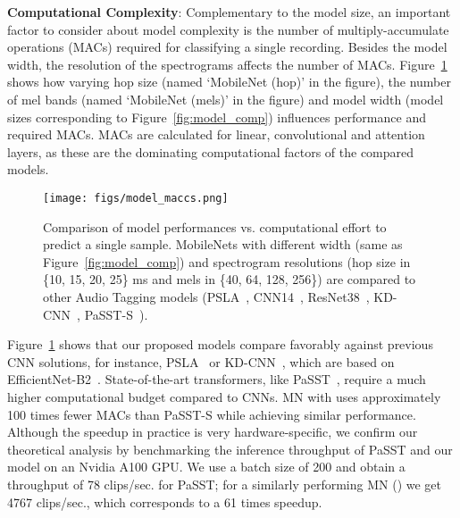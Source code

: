 \documentclass{article}
\begin{document}
\textbf{Computational Complexity}: Complementary to the model size, an important factor to consider about model complexity is the number of multiply-accumulate operations (MACs) required for classifying a single recording. Besides the model width, the resolution of the spectrograms affects the number of MACs. Figure~\ref{fig:model_maccs} shows how varying hop size (named `MobileNet (hop)' in the figure), the number of mel bands (named `MobileNet (mels)' in the figure) and model width (model sizes corresponding to Figure~\ref{fig:model_comp}) influences performance and required MACs. MACs are calculated for linear, convolutional and attention layers, as these are the dominating computational factors of the compared models. 

\begin{figure}[t]
\centering
{\texttt{[image: figs/model\_maccs.png]}}
\caption{Comparison of model performances vs. computational effort to predict a single sample. MobileNets with different width (same as Figure~\ref{fig:model_comp}) and spectrogram resolutions (hop size in \{10, 15, 20, 25\} ms and mels in \{40, 64, 128, 256\}) are compared to other Audio Tagging models (PSLA~\cite{Gong21PSLA}, CNN14~\cite{Kong20PANNs}, ResNet38~\cite{Kong20PANNs}, KD-CNN~\cite{Gong22CMKD}, PaSST-S~\cite{Koutini21Passt}).}\label{fig:model_maccs}\vspace{-14pt}
\end{figure}

Figure~\ref{fig:model_maccs} shows that our proposed models compare favorably against previous CNN solutions, for instance, PSLA~\cite{Gong21PSLA} or KD-CNN~\cite{Gong22CMKD}, which are based on EfficientNet-B2~\cite{Tan19EfficientNet}. State-of-the-art transformers, like PaSST~\cite{Koutini21Passt}, require a much higher computational budget compared to CNNs. MN with  uses approximately 100 times fewer MACs than PaSST-S while achieving similar performance. Although the speedup in practice is very hardware-specific, we confirm our theoretical analysis by benchmarking the inference throughput of PaSST and our model on an Nvidia A100 GPU. We use a batch size of 200 and obtain a throughput of 78 clips/sec. for PaSST; for a similarly performing MN () we get 4767 clips/sec., which corresponds to a 61 times speedup.
\end{document}
